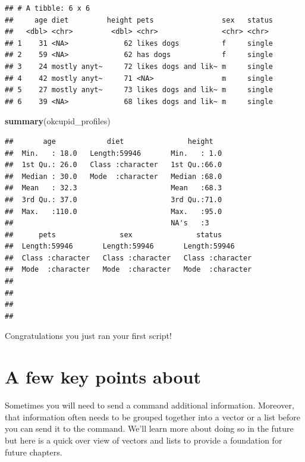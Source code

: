 \documentclass[
]{krantz}
\makeatletter
\newenvironment{Shaded}{\begin{snugshade}}{\end{snugshade}}
\newcommand{\KeywordTok}[1]{\textcolor[rgb]{0.27,0.27,0.27}{\textbf{#1}}}
\newcommand{\NormalTok}[1]{#1}
\newenvironment{kframe}{%
\medskip{}
\setlength{\fboxsep}{.8em}
 \def\at@end@of@kframe{}%
 \ifinner\ifhmode%
  \def\at@end@of@kframe{\end{minipage}}%
  \begin{minipage}{\columnwidth}%
 \fi\fi%
 \def\FrameCommand##1{\hskip\@totalleftmargin \hskip-\fboxsep
 \colorbox{shadecolor}{##1}\hskip-\fboxsep
     \hskip-\linewidth \hskip-\@totalleftmargin \hskip\columnwidth}%
 \MakeFramed {\advance\hsize-\width
   \@totalleftmargin\z@ \linewidth\hsize
   \@setminipage}}%
 {\par\unskip\endMakeFramed%
 \at@end@of@kframe}
\renewenvironment{Shaded}{\begin{kframe}}{\end{kframe}}
\makeatother
\begin{document}
\begin{verbatim}
## # A tibble: 6 x 6
##     age diet         height pets                sex   status
##   <dbl> <chr>         <dbl> <chr>               <chr> <chr> 
## 1    31 <NA>             62 likes dogs          f     single
## 2    59 <NA>             62 has dogs            f     single
## 3    24 mostly anyt~     72 likes dogs and lik~ m     single
## 4    42 mostly anyt~     71 <NA>                m     single
## 5    27 mostly anyt~     73 likes dogs and lik~ m     single
## 6    39 <NA>             68 likes dogs and lik~ m     single
\end{verbatim}

\begin{Shaded}
\begin{Highlighting}[]
\KeywordTok{summary}\NormalTok{(okcupid_profiles)}
\end{Highlighting}
\end{Shaded}

\begin{verbatim}
##       age            diet               height    
##  Min.   : 18.0   Length:59946       Min.   : 1.0  
##  1st Qu.: 26.0   Class :character   1st Qu.:66.0  
##  Median : 30.0   Mode  :character   Median :68.0  
##  Mean   : 32.3                      Mean   :68.3  
##  3rd Qu.: 37.0                      3rd Qu.:71.0  
##  Max.   :110.0                      Max.   :95.0  
##                                     NA's   :3     
##      pets               sex               status         
##  Length:59946       Length:59946       Length:59946      
##  Class :character   Class :character   Class :character  
##  Mode  :character   Mode  :character   Mode  :character  
##                                                          
##                                                          
##                                                          
## 
\end{verbatim}

Congratulations you just ran your first script!

\hypertarget{a-few-key-points-about}{%
\section{A few key points about}\label{a-few-key-points-about}}

Sometimes you will need to send a command additional information. Moreover, that information often needs to be grouped together into a vector or a list before you can send it to the command. We'll learn more about doing so in the future but here is a quick over view of vectors and lists to provide a foundation for future chapters.
\end{document}
